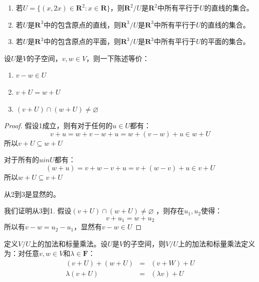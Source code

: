 \documentclass[10pt,a4paper,UTF8]{article}
\begin{document}
\begin{instance}
\begin{enumerate}
\item 若\(U = \{(x,2x)\in \mathbf{R}^{2}:x\in \mathbf{R}\}\)，则\(\mathbf{R}^{2}/U\)是\(\mathbf{R}^{2}\)中所有平行于\(U\)的直线的集合。
\item 若\(U\)是\(\mathbf{R}^{3}\)中的包含原点的直线，则\(\mathbf{R}^{3}/U\)是\(\mathbf{R}^{3}\)中所有平行于\(U\)的直线的集合。
\item 若\(U\)是\(\mathbf{R}^{3}\)中的包含原点的平面，则\(\mathbf{R}^{3}/U\)是\(\mathbf{R}^{3}\)中所有平行于\(U\)的平面的集合。
\end{enumerate}
\end{instance}

\begin{theorem}
设\(U\)是\(V\)的子空间，\(v,w\in V\)，则一下陈述等价：
\begin{enumerate}
\item \(v-w \in U\)
\item \(v+U = w+U\)
\item \((v+U)\cap (w+U) \neq \varnothing\)
\end{enumerate}
\end{theorem}

\begin{proof}
假设1成立，则有对于任何的\(u\in U\)都有：
\begin{equation}
\label{eq:3}
v+ u = w + v-w +u = w + (v-w) +u \in w + U
\end{equation}
所以\(v+U\subseteq w + U\)

对于所有的\(u in U\)都有：
\begin{equation}
\label{eq:4}
(w+u) = v+w -v +u = v + (w-v) + u \in v + U
\end{equation}
所以\(w+U\subseteq v + U\)

从2到3是显然的。

我们证明从3到1. 假设\((v+U)\cap (w+U) \neq \varnothing\) ，则存在\(u_{1},u_{2}\)使得：
\begin{equation}
\label{eq:5}
v+u_{1} = w + u_{2}
\end{equation}
所以有\(v-w = u_{2} - u_{1}\)，显然有\(v-w\in U\)
\end{proof}

\begin{definition}
定义\(V/U\)上的加法和标量乘法。设\(U\)是\(V\)的子空间，则\(V/U\)上的加法和标量乘法定义为：对任意\(v,w\in V\)和\(\lambda \in \mathbf{F}\)：
\begin{eqnarray}
\label{eq:6}
(v+U)+(w+U)&=&(v+W) + U \\
\lambda(v+U) &=&(\lambda v) + U
\end{eqnarray}
\end{definition}
\end{document}
